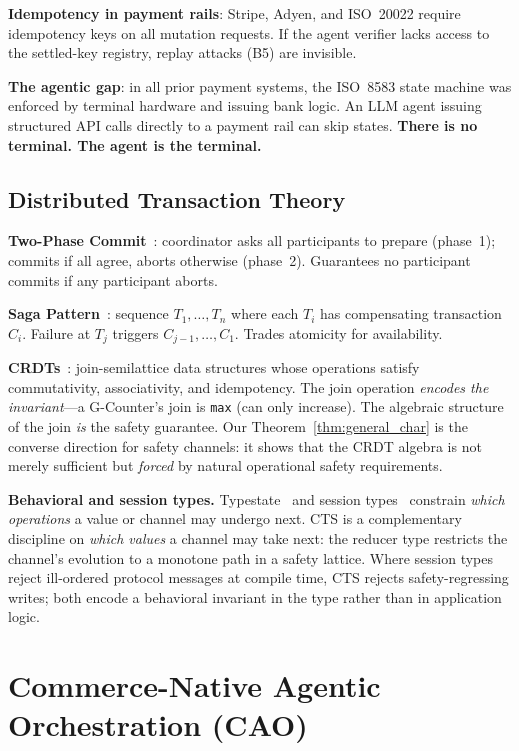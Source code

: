 \documentclass{article}
\begin{document}
\textbf{Idempotency in payment rails}: Stripe, Adyen, and ISO~20022 require idempotency keys on all mutation requests. If the agent verifier lacks access to the settled-key registry, replay attacks (B5) are invisible.

\textbf{The agentic gap}: in all prior payment systems, the ISO~8583 state machine was enforced by terminal hardware and issuing bank logic. An LLM agent issuing structured API calls directly to a payment rail can skip states. \textbf{There is no terminal. The agent is the terminal.}

\subsection{Distributed Transaction Theory}

\textbf{Two-Phase Commit}~\cite{2pc}: coordinator asks all participants to prepare (phase~1); commits if all agree, aborts otherwise (phase~2). Guarantees no participant commits if any participant aborts.

\textbf{Saga Pattern}~\cite{saga}: sequence $T_1, \ldots, T_n$ where each $T_i$ has compensating transaction $C_i$. Failure at $T_j$ triggers $C_{j-1}, \ldots, C_1$. Trades atomicity for availability.

\textbf{CRDTs}~\cite{crdts}: join-semilattice data structures whose operations satisfy commutativity, associativity, and idempotency. The join operation \emph{encodes the invariant}---a G-Counter's join is \texttt{max} (can only increase). The algebraic structure of the join \emph{is} the safety guarantee. Our Theorem~\ref{thm:general_char} is the converse direction for safety channels: it shows that the CRDT algebra is not merely sufficient but \emph{forced} by natural operational safety requirements.

\textbf{Behavioral and session types.} Typestate~\cite{typestate} and session types~\cite{sessiontypes} constrain \emph{which operations} a value or channel may undergo next. CTS is a complementary discipline on \emph{which values} a channel may take next: the reducer type restricts the channel's evolution to a monotone path in a safety lattice. Where session types reject ill-ordered protocol messages at compile time, CTS rejects safety-regressing writes; both encode a behavioral invariant in the type rather than in application logic.

\section{Commerce-Native Agentic Orchestration (CAO)}
\label{sec:cao}
\end{document}
